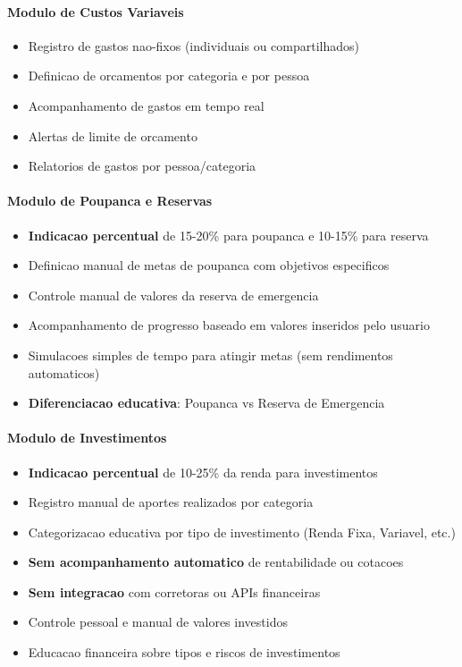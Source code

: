 \paragraph{Modulo de Custos Variaveis}
\begin{itemize}
    \item Registro de gastos nao-fixos (individuais ou compartilhados)
    \item Definicao de orcamentos por categoria e por pessoa
    \item Acompanhamento de gastos em tempo real
    \item Alertas de limite de orcamento
    \item Relatorios de gastos por pessoa/categoria
\end{itemize}

\paragraph{Modulo de Poupanca e Reservas}
\begin{itemize}
    \item \textbf{Indicacao percentual} de 15-20\% para poupanca e 10-15\% para reserva
    \item Definicao manual de metas de poupanca com objetivos especificos
    \item Controle manual de valores da reserva de emergencia
    \item Acompanhamento de progresso baseado em valores inseridos pelo usuario
    \item Simulacoes simples de tempo para atingir metas (sem rendimentos automaticos)
    \item \textbf{Diferenciacao educativa}: Poupanca vs Reserva de Emergencia
\end{itemize}

\paragraph{Modulo de Investimentos}
\begin{itemize}
    \item \textbf{Indicacao percentual} de 10-25\% da renda para investimentos
    \item Registro manual de aportes realizados por categoria
    \item Categorizacao educativa por tipo de investimento (Renda Fixa, Variavel, etc.)
    \item \textbf{Sem acompanhamento automatico} de rentabilidade ou cotacoes
    \item \textbf{Sem integracao} com corretoras ou APIs financeiras
    \item Controle pessoal e manual de valores investidos
    \item Educacao financeira sobre tipos e riscos de investimentos
\end{itemize}

